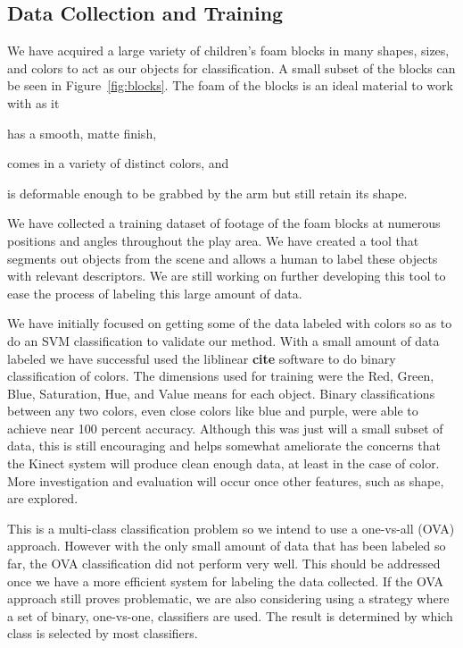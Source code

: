 \documentclass[11pt]{article}
\newcommand{\xxx}[1]{{\bf \color{red} #1}}
\begin{document}
\subsection{Data Collection and Training}
We have acquired a large variety of children's foam blocks in many shapes, sizes, 
and colors to act as our objects for classification. A small subset of the 
blocks can be seen in Figure~\ref{fig:blocks}. The foam of the blocks is an 
ideal material to work with as it
\begin{inparaenum}[(1)]
\item has a smooth, matte finish,
\item comes in a variety of distinct colors, and
\item is deformable enough to be grabbed by the arm but still retain its
shape.
\end{inparaenum}

We have collected a training dataset of footage of the foam blocks at numerous 
positions and angles throughout the play area. We have created a tool that 
segments out objects from the scene and allows a human to label these objects 
with relevant descriptors.  We are still working on further developing this 
tool to ease the process of labeling this large amount of data.

We have initially focused on getting some of the data labeled with colors so as 
to do an SVM classification to validate our method.  With a small amount of 
data labeled we have successful used the liblinear \xxx{cite} software to do 
binary classification of colors.  The dimensions used for training were the 
Red, Green, Blue, Saturation, Hue, and Value means for each object.  Binary 
classifications between any two colors, even close colors like blue and purple, 
were able to achieve near 100 percent accuracy.  Although this was just will a 
small subset of data, this is still encouraging and helps somewhat ameliorate 
the concerns that the Kinect system will produce clean enough data, at least in 
the case of color.  More investigation and evaluation will occur once other 
features, such as shape, are explored.

This is a multi-class classification problem so we intend to use a one-vs-all 
(OVA) approach.  However with the only small amount of data that has been 
labeled so far, the OVA classification did not perform very well.  This should 
be addressed once we have a more efficient system for labeling the data 
collected.  If the OVA approach still proves problematic, we are also 
considering using a strategy where a set of binary, one-vs-one, classifiers are 
used.  The result is determined by which class is selected by most classifiers.
\end{document}
